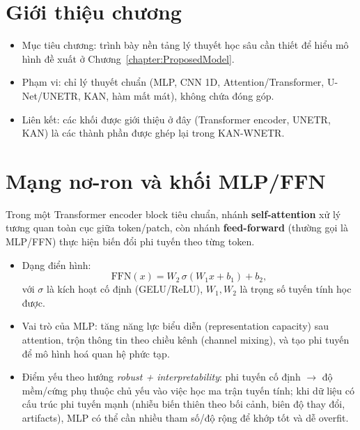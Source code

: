 \documentclass[../DoAn.tex]{subfiles}
\begin{document}

\section{Giới thiệu chương}
\begin{itemize}
  \item Mục tiêu chương: trình bày nền tảng lý thuyết học sâu cần thiết để hiểu mô hình đề xuất ở Chương~\ref{chapter:ProposedModel}.
  \item Phạm vi: chỉ lý thuyết chuẩn (MLP, CNN 1D, Attention/Transformer, U-Net/UNETR, KAN, hàm mất mát), không chứa đóng góp.
  \item Liên kết: các khối được giới thiệu ở đây (Transformer encoder, UNETR, KAN) là các thành phần được ghép lại trong KAN-WNETR.
\end{itemize}

\section{Mạng nơ-ron và khối MLP/FFN}

Trong một Transformer encoder block tiêu chuẩn, nhánh \textbf{self-attention} xử lý tương quan toàn cục giữa token/patch,
còn nhánh \textbf{feed-forward} (thường gọi là MLP/FFN) thực hiện biến đổi phi tuyến theo từng token.

\begin{itemize}
  \item Dạng điển hình:
    \begin{equation}
      \mathrm{FFN}(x)=W_2\,\sigma(W_1x+b_1)+b_2,
    \end{equation}
    với $\sigma$ là kích hoạt cố định (GELU/ReLU), $W_1,W_2$ là trọng số tuyến tính học được.

  \item Vai trò của MLP: tăng năng lực biểu diễn (representation capacity) sau attention, trộn thông tin theo chiều kênh (channel mixing),
    và tạo phi tuyến để mô hình hoá quan hệ phức tạp.

  \item Điểm yếu theo hướng \textit{robust + interpretability}: phi tuyến cố định $\rightarrow$ độ mềm/cứng phụ thuộc chủ yếu vào việc học ma trận tuyến tính;
    khi dữ liệu có cấu trúc phi tuyến mạnh (nhiễu biến thiên theo bối cảnh, biên độ thay đổi, artifacts), MLP có thể cần nhiều tham số/độ rộng để khớp tốt
    và dễ overfit.
\end{itemize}
\end{document}

